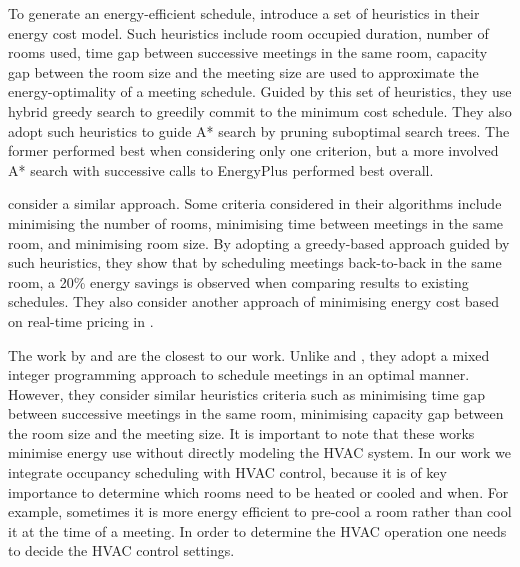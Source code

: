 To generate an energy-efficient schedule, \cite{majumdar2012energy} introduce a set of heuristics in their energy cost model. 
Such heuristics include room occupied duration, number of rooms used, time gap between successive meetings in the same room, capacity gap between the room size and the meeting size are used to approximate the energy-optimality of a meeting schedule. 
Guided by this set of heuristics, they use hybrid greedy search to greedily commit to the minimum cost schedule. They also adopt such heuristics to guide A* search by pruning suboptimal search trees. The former performed best when considering only one criterion, but a more involved A* search with successive calls to EnergyPlus performed best overall.

\cite{pan2012thermal} consider a similar approach. Some criteria considered in their algorithms include minimising the number of rooms, minimising time between meetings in the same room, and minimising room size. By adopting a greedy-based approach guided by such heuristics, they show that by scheduling meetings back-to-back in the same room, a 20\% energy savings is observed when comparing results to existing schedules. They also consider another approach of minimising energy cost based on real-time pricing in \cite{pan2013minimizing}.

The work by \cite{kwak2014building} and \cite{chai2014minimizing} are the closest to our work. Unlike \cite{majumdar2012energy} and \cite{pan2012thermal}, they adopt a mixed integer programming approach to schedule meetings in an optimal manner. However, they consider similar heuristics criteria such as minimising time gap between successive meetings in the same room, minimising capacity gap between the room size and the meeting size. It is important to note that these works minimise energy use without directly modeling the HVAC system. In our work we integrate occupancy scheduling with HVAC control, because it is of key importance to determine which rooms need to be heated or cooled and when. For example, sometimes it is more energy efficient to pre-cool a room rather than cool it at the time of a meeting. In order to determine the HVAC operation one needs to decide the HVAC control settings.

